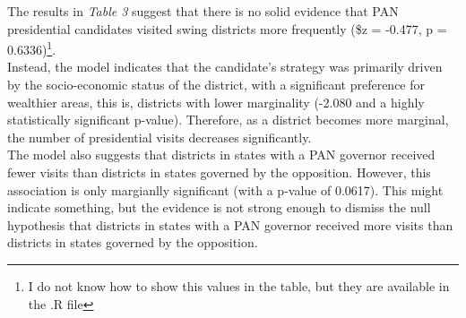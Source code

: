 \documentclass[12pt,letterpaper]{article}
\begin{document}
The results in \textit{Table 3} suggest that there is no solid evidence that PAN presidential candidates visited swing districts more frequently (\$z = -0.477, p = 0.6336)\footnote{I do not know how to show this values in the table, but they are available in the .R file}.\\

Instead, the model indicates that the candidate's strategy was primarily driven by the socio-economic status of the district, with a significant preference for wealthier areas, this is, districts with lower marginality (-2.080 and a highly statistically significant p-value). Therefore, as a district becomes more marginal, the number of presidential visits decreases significantly.\\

The model also suggests that districts in states with a PAN governor received fewer visits than districts in states governed by the opposition. However, this association is only margianlly significant (with a p-value of 0.0617). This might indicate something, but the evidence is not strong enough to dismiss the null hypothesis that districts in states with a PAN governor received more visits than districts in states governed by the opposition.
\end{document}
